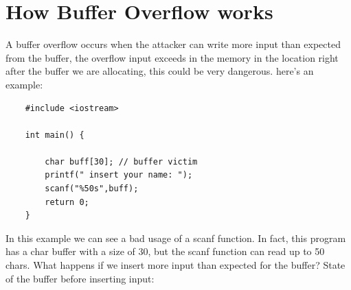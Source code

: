\documentclass{report}
\begin{document}
    \section{How Buffer Overflow works}
    A buffer overflow occurs when the attacker can write more input than expected from the buffer, the overflow input exceeds in the memory in the location right after the buffer we are allocating, this could be very dangerous.\newline
    here's an example:
    \begin{verbatim}
    #include <iostream>
    
    int main() {
    
        char buff[30]; // buffer victim 
        printf(" insert your name: ");
        scanf("%50s",buff); 
        return 0;
    }
    \end{verbatim}
    In this example we can see a bad usage of a scanf function. In fact, this program has a char buffer with a size of 30, but the scanf function can read up to 50 chars.\newline 
    What happens if we insert more input than expected for the buffer?\newline
    State of the buffer before inserting input:
       
\end{document}
